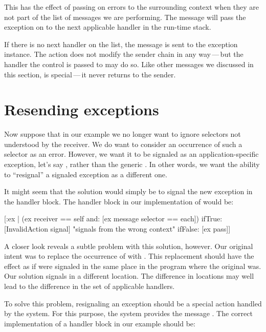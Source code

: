 \documentclass[a4paper,10pt,twoside]{book}
\begin{document}
This has the effect of passing on  errors to the surrounding context when they are not part of the list of messages we are performing. The  message will pass the exception on to the next applicable handler in the run-time stack.

If there is no next handler on the list, the  message is sent to the exception instance. The  action does not modify the sender chain in any way\,---\,but the handler the control is passed to may do so. Like other messages we discussed in this section,  is special\,---\,it never returns to the sender.

\section{Resending exceptions}

Now suppose that in our  example we no longer want to ignore selectors not understood by the receiver. We do want to consider an occurrence of such a selector as an error. However, we want it to be signaled as an application-specific exception, let's say , rather than the generic . In other words, we want the ability to ``resignal'' a signaled exception as a different one.

It might seem that the solution would simply be to signal the new exception in the handler block. The handler block in our implementation of  would be:

\begin{code}{}
[:ex | (ex receiver == self and: [ex message selector == each])
	ifTrue: [InvalidAction signal]    "signals from the wrong context"
	ifFalse: [ex pass]]
\end{code}

A closer look reveals a subtle problem with this solution, however. Our original intent was to replace the occurrence of  with . This replacement should have the effect as if  were signaled in the same place in the program where the original  was. Our solution signals  in a different location. The difference in locations may well lead to the difference in the set of applicable handlers.

To solve this problem, resignaling an exception should be a special action handled by the system. For this purpose, the system provides the message . The correct implementation of a handler block in our  example should be:
\end{document}
